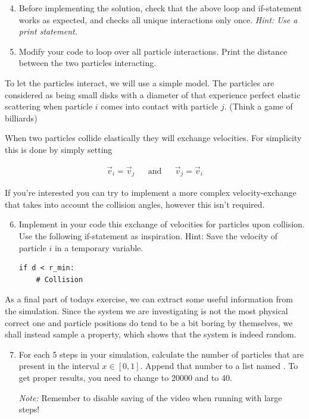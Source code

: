 \documentclass{article}
\begin{document}
\begin{enumerate}
  \setcounter{enumi}{3}
  \item Before implementing the solution, check that the above loop and
    if-statement works as expected, and checks all unique interactions only once. {\em Hint: Use
    a print statement.}

  \item Modify your code to loop over all particle interactions. Print the
    distance between the two particles interacting.

\end{enumerate}

To let the particles interact, we will use a simple model. The
particles are considered as being small disks with a diameter of  that experience
perfect elastic scattering when particle $i$ comes into contact with particle $j$.
(Think a game of billiards)

When two particles collide elastically they will exchange velocities. For simplicity this is done by simply setting

\begin{align}
  \vec{v}_i = \vec{v}_j & & \text{and} & & \vec{v}_j = \vec{v}_i
\end{align}

If you're interested you can try to implement a more complex velocity-exchange that takes into account the collision angles,
however this isn't required.

\begin{enumerate}
  \setcounter{enumi}{5}
  \item Implement in your code this exchange of velocities for particles upon
    collision. Use the following if-statement as inspiration.
    {Hint:} Save the velocity of particle $i$ in a temporary variable.

\begin{lstlisting}
if d < r_min:
    # Collision
\end{lstlisting}

\end{enumerate}

As a final part of todays exercise, we can extract some useful information from the simulation.
Since the system we are investigating is not the most physical correct one and
particle positions do tend to be a bit boring by themselves, we shall instead
sample a property, which shows that the system is indeed random.

\begin{enumerate}
  \setcounter{enumi}{6}
  \item For each 5 steps in your simulation, calculate the number of particles
    that are present in the interval $x \in [0, 1]$.
    Append that number to a list named .  To get proper results,
    you need to change  to 20000 and  to 40.

    {\em Note:} Remember to disable saving of the video when running with large
    steps!

\end{enumerate}
\end{document}
